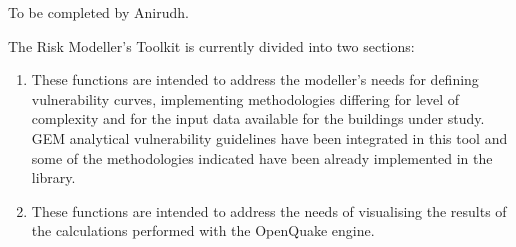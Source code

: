 To be completed by Anirudh.

The Risk Modeller's Toolkit is currently divided into two sections:
\begin{enumerate}
\item These functions are intended to address the modeller's needs for defining vulnerability curves, implementing methodologies differing for level of complexity and for the input data available for the buildings under study. GEM analytical vulnerability guidelines have been integrated in this tool and some of the methodologies indicated have been already implemented in the library.
\item These functions are intended to address the needs of visualising the results of the calculations performed with the OpenQuake engine. 
\end{enumerate}
